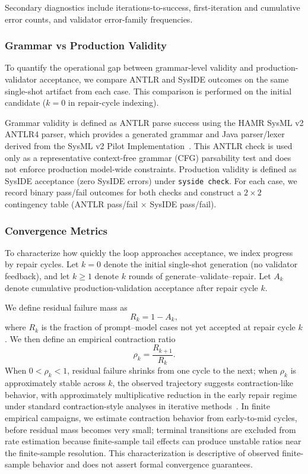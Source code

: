 Secondary diagnostics include iterations-to-success, first-iteration and cumulative error counts, and validator error-family frequencies.

\subsubsection{Grammar vs Production Validity}
To quantify the operational gap between grammar-level validity and production-validator acceptance, we compare ANTLR and SysIDE outcomes on the same single-shot artifact from each case. This comparison is performed on the initial candidate ($k=0$ in repair-cycle indexing).

Grammar validity is defined as ANTLR parse success using the HAMR SysML v2 ANTLR4 parser, which provides a generated grammar and Java parser/lexer derived from the SysML v2 Pilot Implementation~\cite{hamrSysmlParser2026,sysmlV2PilotImplementation2026}. This ANTLR check is used only as a representative context-free grammar (CFG) parsability test and does not enforce production model-wide constraints. Production validity is defined as SysIDE acceptance (zero SysIDE errors) under \texttt{syside check}. For each case, we record binary pass/fail outcomes for both checks and construct a $2\times2$ contingency table (ANTLR pass/fail $\times$ SysIDE pass/fail).

\subsubsection{Convergence Metrics}
To characterize how quickly the loop approaches acceptance, we index progress by repair cycles. Let $k=0$ denote the initial single-shot generation (no validator feedback), and let $k\geq 1$ denote $k$ rounds of generate--validate--repair. Let $A_k$ denote cumulative production-validation acceptance after repair cycle $k$.

We define residual failure mass as
\[
R_k = 1 - A_k,
\]
where $R_k$ is the fraction of prompt--model cases not yet accepted at repair cycle $k$. We then define an empirical contraction ratio
\[
\rho_k = \frac{R_{k+1}}{R_k}.
\]
When $0 < \rho_k < 1$, residual failure shrinks from one cycle to the next; when $\rho_k$ is approximately stable across $k$, the observed trajectory suggests contraction-like behavior, with approximately multiplicative reduction in the early repair regime under standard contraction-style analyses in iterative methods~\cite{banach1922operations,varga2009matrix,nocedal2006numerical,he2016averageConvergenceRate}.
In finite empirical campaigns, we estimate contraction behavior from early-to-mid cycles, before residual mass becomes very small; terminal transitions are excluded from rate estimation because finite-sample tail effects can produce unstable ratios near the finite-sample resolution.
This characterization is descriptive of observed finite-sample behavior and does not assert formal convergence guarantees.

